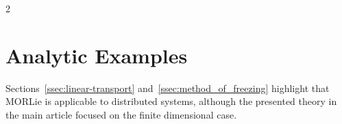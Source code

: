 \documentclass{article}
\begin{document}
\begin{multicols}{2}








\section{Analytic Examples}\label{sec:analytic_examples}

Sections~\ref{ssec:linear-transport} and~\ref{ssec:method_of_freezing} highlight that MORLie is applicable to distributed systems, although the presented theory in the main article focused on the finite dimensional case. 


\end{multicols}
\end{document}
